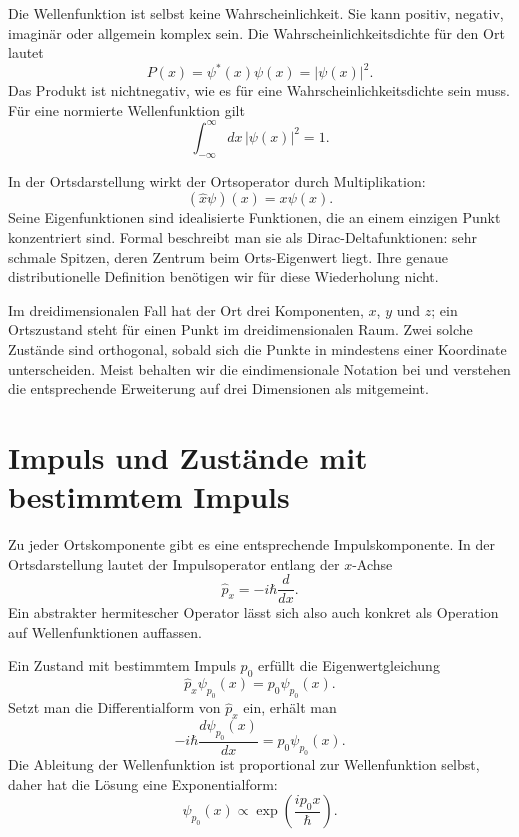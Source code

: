 Die Wellenfunktion ist selbst keine Wahrscheinlichkeit. Sie kann positiv, negativ, imaginär oder allgemein komplex sein. Die Wahrscheinlichkeitsdichte für den Ort lautet
\begin{equation}
P(x)=\psi^*(x)\psi(x)=|\psi(x)|^2.
\end{equation}
Das Produkt ist nichtnegativ, wie es für eine Wahrscheinlichkeitsdichte sein muss. Für eine normierte Wellenfunktion gilt
\begin{equation}
\int_{-\infty}^{\infty}dx\,|\psi(x)|^2=1.
\end{equation}

In der Ortsdarstellung wirkt der Ortsoperator durch Multiplikation:
\begin{equation}
(\hat x\psi)(x)=x\psi(x).
\end{equation}
Seine Eigenfunktionen sind idealisierte Funktionen, die an einem einzigen Punkt konzentriert sind. Formal beschreibt man sie als Dirac-Deltafunktionen: sehr schmale Spitzen, deren Zentrum beim Orts-Eigenwert liegt. Ihre genaue distributionelle Definition benötigen wir für diese Wiederholung nicht.

Im dreidimensionalen Fall hat der Ort drei Komponenten, \(x\), \(y\) und \(z\); ein Ortszustand steht für einen Punkt im dreidimensionalen Raum. Zwei solche Zustände sind orthogonal, sobald sich die Punkte in mindestens einer Koordinate unterscheiden. Meist behalten wir die eindimensionale Notation bei und verstehen die entsprechende Erweiterung auf drei Dimensionen als mitgemeint.

\section{Impuls und Zustände mit bestimmtem Impuls}

Zu jeder Ortskomponente gibt es eine entsprechende Impulskomponente. In der Ortsdarstellung lautet der Impulsoperator entlang der \(x\)-Achse
\begin{equation}
\hat p_x=-i\hbar\frac{d}{dx}.
\end{equation}
Ein abstrakter hermitescher Operator lässt sich also auch konkret als Operation auf Wellenfunktionen auffassen.

Ein Zustand mit bestimmtem Impuls \(p_0\) erfüllt die Eigenwertgleichung
\begin{equation}
\hat p_x\psi_{p_0}(x)=p_0\psi_{p_0}(x).
\end{equation}
Setzt man die Differentialform von \(\hat p_x\) ein, erhält man
\begin{equation}
-i\hbar\frac{d\psi_{p_0}(x)}{dx}
=p_0\psi_{p_0}(x).
\end{equation}
Die Ableitung der Wellenfunktion ist proportional zur Wellenfunktion selbst, daher hat die Lösung eine Exponentialform:
\begin{equation}
\psi_{p_0}(x)\propto
\exp\left(\frac{ip_0x}{\hbar}\right).
\end{equation}

